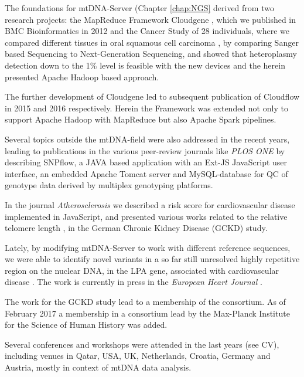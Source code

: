 The foundations for mtDNA-Server (Chapter \ref{chap:NGS} derived from two research projects: the MapReduce Framework Cloudgene \cite{Schonherr2012}, which we published in BMC Bioinformatics in 2012 and the Cancer Study of 28 individuals, where we compared different tissues in oral squamous cell carcinoma \cite{Kloss-Brandstatter2015}, by comparing Sanger based Sequencing to Next-Generation Sequencing, and showed that heteroplasmy detection down to the 1\% level is feasible with the new devices and the herein presented Apache Hadoop based approach. 

The further development of Cloudgene led to subsequent publication of Cloudflow in  2015 \cite{Forer2015} and 2016 \cite{Forer2016} respectively. Herein the Framework was extended not only to support Apache Hadoop with MapReduce but also Apache Spark pipelines. 

Several topics outside the mtDNA-field were also addressed in the recent years, leading to publications in the various peer-review journals like \textit{PLOS ONE} \cite{Weissensteiner2013} by describing SNPflow, a JAVA based application with an Ext-JS JavaScript user interface, an embedded Apache Tomcat server and MySQL-database for QC of genotype data derived by multiplex genotyping platforms. 

In the journal \textit{Atherosclerosis} we described a risk score for cardiovascular disease\cite{Lamina2014} implemented in JavaScript, and presented various works related to the relative telomere length \cite{Raschenberger2015assoc,Raschenberger2015dotelomeres}, in the German Chronic Kidney Disease (GCKD) study.

Lately, by modifying mtDNA-Server to work with different reference sequences, we were able to identify novel variants in a so far still unresolved highly repetitive region on the nuclear DNA, in the LPA gene, associated with cardiovascular disease \cite{Kronenberg2014}. The work is currently in press in the \textit{European Heart Journal} \cite{Coassin2017}. 


The work for the GCKD study lead to a membership of the consortium. As of February 2017 a membership in a consortium lead by the Max-Planck Institute for the Science of Human History was added.

Several conferences and workshops were attended in the last years (see CV), including venues in Qatar, USA, UK, Netherlands, Croatia, Germany and Austria, mostly in context of mtDNA data analysis. 


